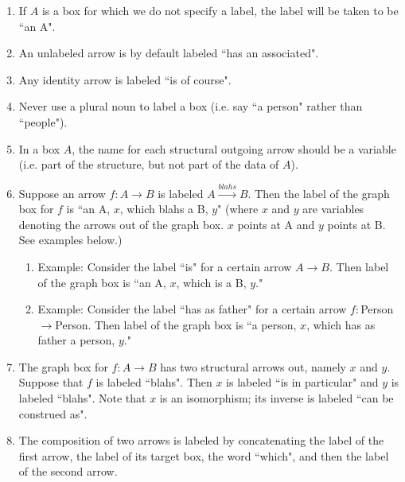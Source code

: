 \documentclass{amsart}
\def\to{\rightarrow}
\def\To{\xrightarrow}
\def\taking{\colon}
\begin{document}
\begin{enumerate}

\item If $A$ is a box for which we do not specify a label, the label will be taken to be ``an A".

\item An unlabeled arrow is by default labeled ``has an associated".

\item Any identity arrow is labeled ``is of course".

\item Never use a plural noun to label a box (i.e. say ``a person" rather than ``people").

\item In a box $A$, the name for each structural outgoing arrow should be a variable (i.e. part of the structure, but not part of the data of $A$).  

\item Suppose an arrow $f\taking A\to B$ is labeled $A\To{blahs}B$.  Then the label of the graph box for $f$ is ``an A, $x$,  which blahs a B, $y$" (where $x$ and $y$ are variables denoting the arrows out of the graph box.  $x$ points at A and $y$ points at B.  See examples below.)

\begin{enumerate}

\item Example: Consider the label ``is" for a certain arrow $A\to B$.   Then label of the graph box is ``an A, $x$, which is a B, $y$."  

\item Example: Consider the label ``has as father" for a certain arrow $f\taking$Person$\to$Person.  Then label of the graph box is ``a person, $x$, which has as father a person, $y$."

\end{enumerate}

\item The graph box for $f\taking A\to B$ has two structural arrows out, namely $x$ and $y$.  Suppose that $f$ is labeled ``blahs".  Then $x$ is labeled ``is in particular" and $y$ is labeled ``blahs".  Note that $x$ is an isomorphism; its inverse is labeled ``can be construed as".

\item The composition of two arrows is labeled by concatenating the label of the first arrow, the label of its target box, the word ``which", and then the label of the second arrow.


\end{enumerate}
\end{document}
